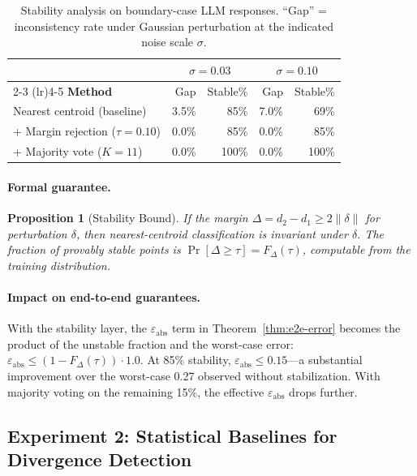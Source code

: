 \documentclass[11pt]{article}
\newtheorem{proposition}[theorem]{Proposition}
\begin{document}
\begin{table}[t]
\centering
\caption{Stability analysis on boundary-case LLM responses.
  ``Gap'' = inconsistency rate under Gaussian perturbation at
  the indicated noise scale $\sigma$.}
\label{tab:stability}
\small
\begin{tabular}{@{}lrrrr@{}}
\toprule
& \multicolumn{2}{c}{\textbf{$\sigma = 0.03$}} & \multicolumn{2}{c}{\textbf{$\sigma = 0.10$}} \\
\cmidrule(lr){2-3} \cmidrule(lr){4-5}
\textbf{Method} & Gap & Stable\% & Gap & Stable\% \\
\midrule
Nearest centroid (baseline) & 3.5\% & 85\% & 7.0\% & 69\% \\
+ Margin rejection ($\tau{=}0.10$) & 0.0\% & 85\% & 0.0\% & 85\% \\
+ Majority vote ($K{=}11$) & 0.0\% & 100\% & 0.0\% & 100\% \\
\bottomrule
\end{tabular}
\end{table}

\paragraph{Formal guarantee.}
\begin{proposition}[Stability Bound]\label{prop:stability}
If the margin $\Delta = d_2 - d_1 \ge 2\|\delta\|$ for perturbation
$\delta$, then nearest-centroid classification is invariant under
$\delta$.  The fraction of provably stable points is
$\Pr[\Delta \ge \tau] = F_\Delta(\tau)$, computable from the
training distribution.
\end{proposition}

\paragraph{Impact on end-to-end guarantees.}
With the stability layer, the $\varepsilon_{\mathrm{abs}}$ term in
Theorem~\ref{thm:e2e-error} becomes the product of the unstable
fraction and the worst-case error:
$\varepsilon_{\mathrm{abs}} \le (1 - F_\Delta(\tau)) \cdot 1.0$.
At 85\% stability, $\varepsilon_{\mathrm{abs}} \le 0.15$---a
substantial improvement over the worst-case 0.27 observed without
stabilization.  With majority voting on the remaining 15\%,
the effective $\varepsilon_{\mathrm{abs}}$ drops further.

\subsection{Experiment 2: Statistical Baselines for Divergence Detection}\label{sec:stat-baselines}
\end{document}
